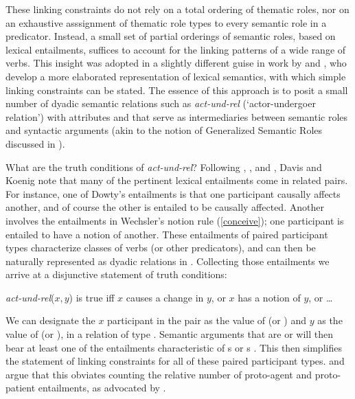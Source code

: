 \documentclass[output=paper
                ,modfonts
                ,nonflat
	        ,collection
	        ,collectionchapter
	        ,collectiontoclongg
 	        ,biblatex
                ,babelshorthands
                ,newtxmath
                ,draftmode
                ,colorlinks, citecolor=brown
]{./langsci/langscibook}
\begin{document}
These linking constraints do not rely on a total ordering of thematic roles, nor on an exhaustive asssignment of thematic role types to every semantic role in a predicator. Instead, a small set of partial orderings of semantic roles, based on lexical entailments, suffices to account for the linking patterns of a wide range of verbs. 
This insight was adopted in a slightly different guise in work by \citet{Davis1996,Davis2001} and \cite{DavisandKoenig2000b}, who develop a more elaborated representation of lexical semantics, with which simple linking constraints can be stated.
The essence of this approach is to posit a small number of dyadic semantic relations such as \textit{act-und-rel} (`actor-undergoer relation') with attributes    and   that serve as intermediaries between semantic roles and syntactic arguments (akin to the notion of Generalized Semantic Roles discussed in \citealt{VanValin1999}).  

What are the truth conditions of \textit{act-und-rel}?  
Following \citet{Fillmore1977}, \citet{Dowty1991}, and \citet{Wechsler1995b}, Davis and Koenig note that many of the pertinent lexical entailments come in related pairs.
For instance, one of Dowty's entailments is that one participant causally affects another, and of course the other is entailed to be causally affected.
Another involves the entailments in Wechsler's notion rule (\ref{conceive}); one participant is entailed to have a notion of another. 
These entailments of paired participant types characterize classes of verbs (or other predicators), and can then be naturally represented as dyadic relations in .  Collecting those entailments we arrive at a disjunctive statement of truth conditions:

\begin{exe}
\ex \textit{act-und-rel}($x,y$) is true iff $x$ causes a change in $y$, or $x$ has a notion of $y$, or \ldots
\end{exe}

\noindent
We can designate the $x$ participant  in the pair as the value of  (or ) and $y$ as the value of  (or ), in a relation of type .   Semantic arguments that are  or  will then bear at least one of the entailments characteristic of s or s \citep[72]{DavisandKoenig2000b}. This then simplifies the statement of linking constraints for all of these paired participant types.
\citet{Davis1996} and \citet{KoenigandDavis2001} argue that this obviates counting the relative number of proto-agent and proto-patient entailments, as advocated by \citet{Dowty1991}.
\end{document}
